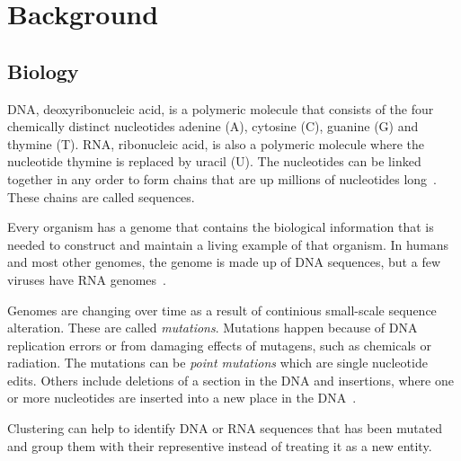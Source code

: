 \section{Background}

\subsection{Biology} DNA, deoxyribonucleic acid, is a polymeric molecule that
consists of the four chemically distinct nucleotides adenine (A), cytosine
(C), guanine (G) and thymine (T). RNA, ribonucleic acid, is also a polymeric
molecule where the nucleotide thymine is replaced by uracil (U).  The
nucleotides can be linked together in any order to form chains that are up
millions of nucleotides long~\cite[pp.~8-9]{brown}. These chains are called
sequences.

Every organism has a genome that contains the biological information that is
needed to construct and maintain a living example of that organism. In humans
and most other genomes, the genome is made up of DNA sequences, but a few
viruses have RNA genomes~\cite[pp. 3-4]{brown}.

Genomes are changing over time as a result of continious small-scale sequence
alteration. These are called \textit{mutations}. Mutations happen because of
DNA replication errors or from damaging effects of mutagens, such as chemicals
or radiation. The mutations can be \textit{point mutations} which are single
nucleotide edits. Others include deletions of a section in the DNA and
insertions, where one or more nucleotides are inserted into a new place in the
DNA~\cite[pp. 505-506]{brown}.

Clustering can help to identify DNA or RNA sequences that has been mutated and
group them with their representive instead of treating it as a new entity.

